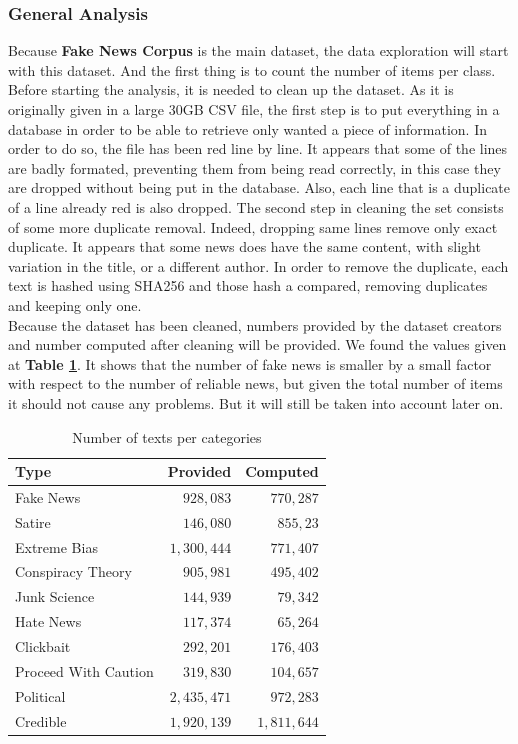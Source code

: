 \subsubsection{General Analysis}
 Because \textbf{Fake News Corpus} is the main dataset, the data exploration will start with this dataset. And the first thing is to count the number of items per class. Before starting the analysis, it is needed to clean up the dataset. As it is originally given in a large 30GB CSV file, the first step is to put everything in a database in order to be able to retrieve only wanted a piece of information. In order to do so, the file has been red line by line. It appears that some of the lines are badly formated, preventing them from being read correctly, in this case they are dropped without being put in the database. Also, each line that is a duplicate of a line already red is also dropped. The second step in cleaning the set consists of some more duplicate removal. Indeed, dropping same lines remove only exact duplicate. It appears that some news does have the same content, with slight variation in the title, or a different author. In order to remove the duplicate, each text is hashed using SHA256 and those hash a compared, removing duplicates and keeping only one. \\
Because the dataset has been cleaned, numbers provided by the dataset creators and number computed after cleaning will be provided. We found the values given at \textbf{Table \ref{tab:explo:count1}}. It shows that the number of fake news is smaller by a small factor with respect to the number of reliable news, but given the total number of items it should not cause any problems. But it will still be taken into account later on. 
\begin{table}[h]
\centering
 \begin{tabular}{l|r|r}
  Type & Provided & Computed\\
  \hline
  Fake News & $928,083$ & $770,287$\\
  Satire & $146,080$ & $855,23$\\
  Extreme Bias & $1,300,444$ & $771,407$\\
  Conspiracy Theory & $905,981$ & $495,402$\\
  Junk Science & $144,939$ & $79,342$\\
  Hate News & $117,374$ & $65,264$\\
  Clickbait & $292,201$ & $176,403$\\
  Proceed With Caution & $319,830$ & $104,657$\\
  Political & $2,435,471$ & $972,283$\\
  Credible & $1,920,139$ & $1,811,644$\\
  \hline
\end{tabular}
  \caption{Number of texts per categories}
  \label{tab:explo:count1}
\end{table}

